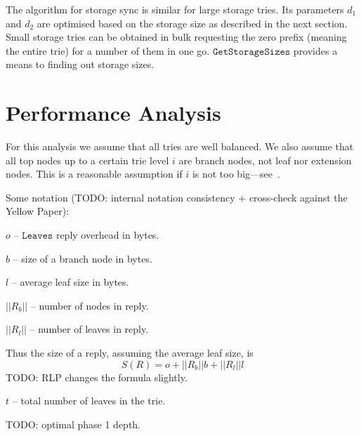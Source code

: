 \documentclass{amsart}
\begin{document}
The algorithm for storage sync is similar for large storage tries.
Its parameters $d_1$ and $d_2$ are optimised based on the storage size as described in the next section.
Small storage tries can be obtained in bulk requesting the zero prefix (meaning the entire trie) for a number of them in one go.
$\texttt{GetStorageSizes}$ provides a means to finding out storage sizes.

\section{Performance Analysis}

For this analysis we assume that all tries are well balanced.
We also assume that all top nodes up to a certain trie level $i$ are branch nodes, not leaf nor extension nodes.
This is a reasonable assumption if $i$ is not too big---see~\cite{akhunov_1x_workshop_part2}.

Some notation (TODO: internal notation consistency + cross-check against the Yellow Paper):

$o$ -- $\texttt{Leaves}$ reply overhead in bytes.

$b$ -- size of a branch node in bytes.

$l$ -- average leaf size in bytes.

$||R_b||$ -- number of nodes in reply.

$||R_l||$ -- number of leaves in reply.

Thus the size of a reply, assuming the average leaf size, is
\begin{equation}
    S(R) = o + ||R_b|| b + ||R_l|| l
\end{equation}
TODO: RLP changes the formula slightly.

$t$ -- total number of leaves in the trie.

TODO: optimal phase 1 depth.
\end{document}
